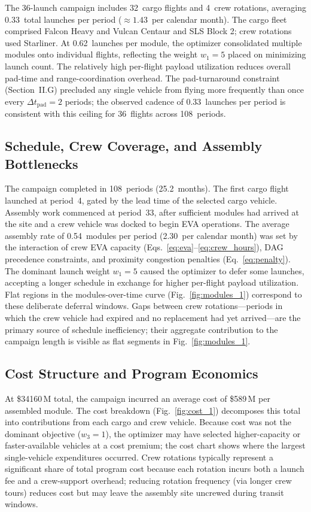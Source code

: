 The 36-launch campaign includes
32~cargo
flights
and 4~crew
rotations,
averaging
0.33~total
launches per period
($\approx1.43$~per
calendar month).
The cargo fleet comprised
Falcon Heavy and Vulcan Centaur and SLS Block 2;
crew rotations used
Starliner.
At 0.62~launches per module,
the optimizer consolidated multiple modules onto individual
flights, reflecting the weight $w_1 = 5$
placed on minimizing launch count.
The relatively high per-flight payload utilization reduces
overall pad-time and range-coordination overhead.
The pad-turnaround constraint (Section~II.G) precluded any
single vehicle from flying more frequently than once every
$\Delta t_{\mathrm{pad}} = 2$ periods; the observed cadence
of 0.33~launches
per period is consistent with this ceiling for
36~flights across
108~periods.

\subsection{Schedule, Crew Coverage, and Assembly Bottlenecks}

The campaign completed in 108~periods
(25.2~months).
The first cargo flight launched at period~4,
gated by the lead time of the selected cargo vehicle.
Assembly work commenced at period~33,
after sufficient modules had arrived at the site and a crew
vehicle was docked to begin EVA operations.
The average assembly rate of
0.54~modules per period
(2.30~per calendar month) was
set by the interaction of crew EVA capacity
(Eqs.~\ref{eq:eva}--\ref{eq:crew_hours}), DAG precedence
constraints, and proximity congestion penalties
(Eq.~\ref{eq:penalty}).
The dominant launch weight $w_1 = 5$
caused the optimizer to defer some launches, accepting a longer
schedule in exchange for higher per-flight payload utilization.
Flat regions in the modules-over-time curve
(Fig.~\ref{fig:modules_1}) correspond to these deliberate
deferral windows.
Gaps between crew rotations---periods in which the crew vehicle
had expired and no replacement had yet arrived---are the primary
source of schedule inefficiency; their aggregate contribution
to the campaign length is visible as flat segments in
Fig.~\ref{fig:modules_1}.

\subsection{Cost Structure and Program Economics}

At \$34160\,M total,
the campaign incurred an average cost of
\$589\,M per
assembled module.
The cost breakdown (Fig.~\ref{fig:cost_1}) decomposes this
total into contributions from each cargo and crew vehicle.
Because cost was not the dominant objective
($w_3 = 1$), the optimizer may have
selected higher-capacity or faster-available vehicles at a cost
premium; the cost chart shows where the largest single-vehicle
expenditures occurred.
Crew rotations typically represent a significant share of total
program cost because each rotation incurs both a launch fee and
a crew-support overhead; reducing rotation frequency (via longer
crew tours) reduces cost but may leave the assembly site
uncrewed during transit windows.

